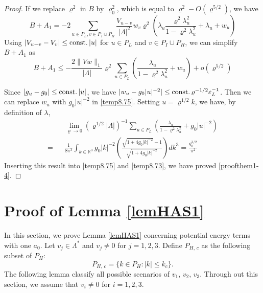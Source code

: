 \documentclass[11pt]{article}
\numberwithin{equation}{section}
\newcommand{\beq}{\begin{equation}}
\newcommand{\eeq}{\end{equation}}
\newcommand{\beqa}{\begin{eqnarray}}
\newcommand{\eeqa}{\end{eqnarray}}
\newcommand\R{{\mathbb R}}
\newcommand\eps{\varepsilon}
\newcommand\const{{\rm const.\, }}
\renewcommand\rho\varrho
\theoremstyle{definition}
\begin{document}
\begin{proof}
If we replace $\rho^{2}$ in $B$ by  $\rho_{0}^{2}$, which is equal to $\rho^2-O(\rho^{5/2})$, we have 
\beq
B+ A_{1}=
-2\sum_{u\in P_L,v\in P_I\cup P_H}\frac{V_{u-v}}{|\Lambda|^2}w_v\rho^2\left(\lambda_u\frac{\rho^2\lambda_u^2}{1-\rho^2\lambda_{u}^2}+\lambda_u+w_u\right) 
\eeq
Using  $|V_{u-v}-V_v|\leq \const |u|$ for $u \in P_{L}$ and $v \in P_{I}\cup P_{H}$,  we can simplify $B+A_1$ as
\beq\label{temp8.75}
B+A_1\leq -\frac{2\|Vw\|_1}{|\Lambda|}\rho^2\sum_{u\in P_L}\left(\frac{\lambda_u}{1-\rho^2\lambda_{u}^2}+w_u\right)+o(\rho^{5/2})
\eeq

Since  $|g_u-g_0|\leq \const|u|$, we have $| w_u- g_0|u|^{-2}|\leq \const \rho^{-1/2}\eps_L^{-1}$. Then we can replace $w_u$ with $g_0|u|^{-2}$ in \eqref{temp8.75}. Setting  $u=\rho^{1/2}k$, we have, by definition of $\lambda$, 
\beqa
&&\lim_{\rho\to 0}(\rho^{1/2}|\Lambda|)^{-1}\sum_{u\in P_L}\left(\frac{\lambda_u}{1-\rho^2\lambda^2_u}+g_0|u|^{-2}\right)\\\nonumber
=&&\frac{1}{8\pi^3}\int_{k\in \R^3}g_0|k|^{-2}\left(\frac{\sqrt{1+4g_0|k|^{-2}}-1}{\sqrt{1+4g_0|k|^{-2}}}\right)dk^3=\frac{g_0^{3/2}}{\pi^2}
\eeqa
Inserting this result  into \eqref{temp8.75} and \eqref{temp8.73}, we have proved \eqref{proofthem1-4}.
\end{proof}
\section{Proof of Lemma \ref{lemHAS1}}

In this section, we  prove Lemma \ref{lemHAS1} concerning  potential energy terms with one $a_{0}$. 
Let  $v_j\in \Lambda^*$ and $v_{j}\neq 0$ for $j = 1, 2, 3$.  Define $P_{H,\,c}$ as the following  subset of $P_H$:
\beq\label{defPHc}
P_{H,\,c}=\{k\in P_H: |k|\leq k_c\}.
\eeq
The following lemma classify all possible scenarios of $v_1,\,v_2,\,v_3$. Through out  this section, we assume that $v_{i} \not = 0$
for $i=1, 2, 3$. 
\end{document}
